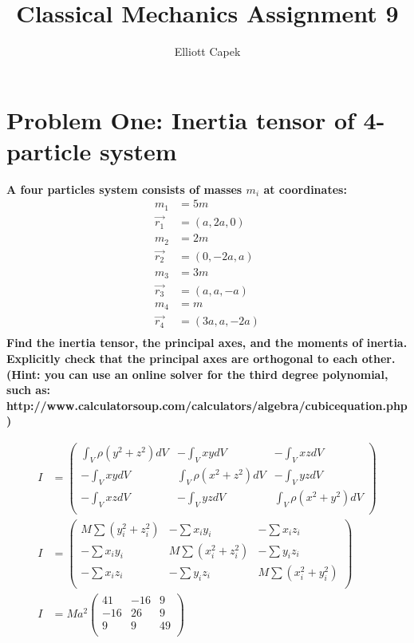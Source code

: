 \documentclass[10pt]{article} %
\title{Classical Mechanics Assignment 9}
\author{Elliott Capek}
\begin{document}
\maketitle{}

\section{Problem One: Inertia tensor of 4-particle system}

\textbf{A four particles system consists of masses $m_i$ at coordinates:}
\begin{align*}
  m_1 &= 5m\\
  \vec{r_1} &= (a, 2a, 0)\\
  m_2 &= 2m\\
  \vec{r_2} &= (0, -2a, a)\\
  m_3 &= 3m\\
  \vec{r_3} &= (a, a, -a)\\
  m_4 &= m\\
  \vec{r_4} &= (3a, a, -2a)\\
\end{align*}
\textbf{Find the inertia tensor, the principal axes, and the moments of inertia. Explicitly check that the principal axes are orthogonal to each other. (Hint: you can use an online solver for the third degree polynomial, such as: http://www.calculatorsoup.com/calculators/algebra/cubicequation.php)}

\begin{align*}
  I &=
  \begin{pmatrix}
    \int_V \rho(y^2+z^2)dV & -\int_V xydV & -\int_V xzdV\\
     -\int_V xydV & \int_V \rho(x^2+z^2)dV & -\int_V yzdV\\
     -\int_V xzdV & -\int_V yzdV & \int_V \rho(x^2+y^2)dV\\
  \end{pmatrix}\\
  I &=
  \begin{pmatrix}
    M\sum (y_i^2+z_i^2) & -\sum x_iy_i & -\sum x_iz_i\\
     -\sum x_iy_i & M\sum (x_i^2+z_i^2) & -\sum y_iz_i\\
     -\sum x_iz_i & -\sum y_iz_i & M\sum (x_i^2+y_i^2)\\
  \end{pmatrix}\\
  I &=
  Ma^2
  \begin{pmatrix}
    41 & -16 & 9\\
    -16 & 26 & 9\\
    9 & 9 & 49\\
  \end{pmatrix}
\end{align*}
\end{document}
